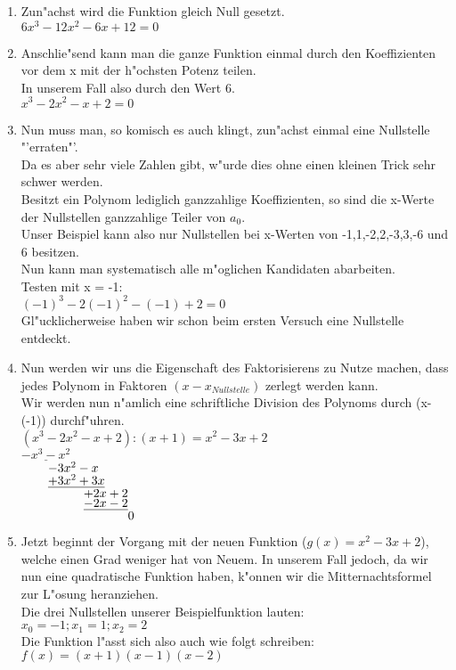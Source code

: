 \begin{enumerate}
\item Zun"achst wird die Funktion gleich Null gesetzt.\\
$6x^3 - 12x^2 - 6x + 12 = 0$
\item Anschlie"send kann man die ganze Funktion einmal durch den Koeffizienten vor dem x mit der h"ochsten Potenz teilen.\\
In unserem Fall also durch den Wert 6.\\
$ x^3 -2x^2 - x + 2 = 0 $
\item Nun muss man, so komisch es auch klingt, zun"achst einmal eine Nullstelle "'erraten"'.\\
Da es aber sehr viele Zahlen gibt, w"urde dies ohne einen kleinen Trick sehr schwer werden.\\
Besitzt ein Polynom lediglich ganzzahlige Koeffizienten, so sind die x-Werte der Nullstellen ganzzahlige Teiler von $a_0$.\\
Unser Beispiel kann also nur Nullstellen bei x-Werten von -1,1,-2,2,-3,3,-6 und 6 besitzen.\\
Nun kann man systematisch alle m"oglichen Kandidaten abarbeiten.\\
Testen mit x = -1:\\
$(-1)^3 - 2(-1)^2 - (-1) + 2 = 0$\\
Gl"ucklicherweise haben wir schon beim ersten Versuch eine Nullstelle entdeckt.\\
\item Nun werden wir uns die Eigenschaft des Faktorisierens zu Nutze machen, dass jedes Polynom in Faktoren $(x-x_{Nullstelle})$ zerlegt werden kann.\\
Wir werden nun n"amlich eine schriftliche Division des Polynoms durch (x-(-1)) durchf"uhren.\vspace{0.5 cm}\\
$ (x^3 - 2x^2 - x + 2):(x+1)= x^2 - 3x + 2$\\
$ \underline{-x^3 - x^2} $\\
$ \hspace{0.75 cm} -3x^2 - x $\\
$ \hspace{0.75 cm} \underline{+3x^2 + 3x} $\\
$ \hspace{1.75 cm} +2x + 2$\\
$ \hspace{1.75 cm} \underline{-2x - 2}$\\
$ \hspace{3 cm} 0$
\item Jetzt beginnt der Vorgang mit der neuen Funktion ($g(x) = x^2 - 3x + 2$), welche einen Grad weniger hat von Neuem. In unserem Fall jedoch, da wir nun eine quadratische Funktion haben, k"onnen wir die Mitternachtsformel zur L"osung heranziehen.\\
Die drei Nullstellen unserer Beispielfunktion lauten:\\
$x_0 = -1; x_1 = 1; x_2 = 2$\\
Die Funktion l"asst sich also auch wie folgt schreiben:\\
$f(x)=(x+1)(x-1)(x-2)$
\end{enumerate}